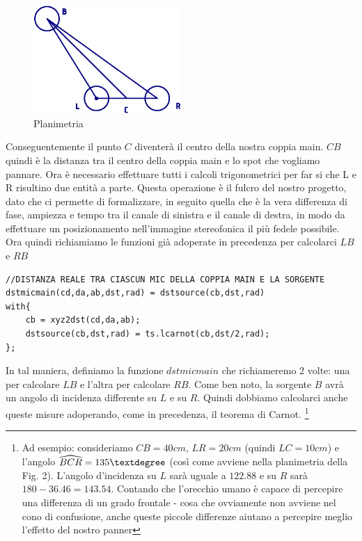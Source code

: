 \documentclass{article}
\begin{document}
    \begin{figure}[H]
        \centering
        \includegraphics[width=0.5\textwidth]{images/PLANIMETRIA.png}
         \caption{\label{fig2}Planimetria}
    \end{figure}

    Conseguentemente il punto $C$ diventerà il centro della nostra coppia main. $CB$ quindi è la distanza tra il centro della coppia main e lo spot che vogliamo pannare.
    Ora è necessario effettuare tutti i calcoli trigonometrici per far si che L e R risultino due entità a parte. Questa operazione è il fulcro del nostro progetto, dato che ci permette di formalizzare, in seguito quella che è la vera differenza di fase, ampiezza e tempo tra il canale di sinistra e il canale di destra, in modo da effettuare un posizionamento nell'immagine stereofonica il più fedele possibile. %
    Ora quindi richiamiamo le funzioni già adoperate in precedenza per calcolarci $LB$ e $RB$ \\
    
    \begin{lstlisting}
//DISTANZA REALE TRA CIASCUN MIC DELLA COPPIA MAIN E LA SORGENTE
dstmicmain(cd,da,ab,dst,rad) = dstsource(cb,dst,rad)
with{
    cb = xyz2dst(cd,da,ab);
    dstsource(cb,dst,rad) = ts.lcarnot(cb,dst/2,rad);
};
    \end{lstlisting}
    
    In tal maniera, definiamo la funzione $dstmicmain$ che richiameremo 2 volte: una per calcolare $LB$ e l'altra per calcolare $RB$.
    Come ben noto, la sorgente $B$ avrà un angolo di incidenza differente su $L$ e su $R$. Quindi dobbiamo calcolarci anche queste misure adoperando, come in precedenza, il teorema di Carnot.
    \footnote{Ad esempio: consideriamo $CB = 40 cm$, $LR = 20cm$ (quindi $LC=10cm$) e l'angolo $\widehat{BCR} = 135\textdegree$ (così come avviene nella planimetria della Fig. 2). L'angolo d'incidenza su $L$ sarà uguale a $122.88$ e su $R$ sarà $180-36.46=143.54$. Contando che l'orecchio umano è capace di percepire una differenza di un grado frontale - cosa che ovviamente non avviene nel cono di confusione, anche queste piccole differenze aiutano a percepire meglio l'effetto del nostro panner}
    
\end{document}
